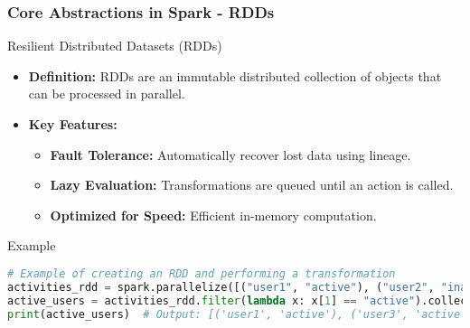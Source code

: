 \documentclass[aspectratio=169]{beamer}
\begin{document}
\begin{frame}[fragile]
    \frametitle{Core Abstractions in Spark - RDDs}
    \begin{block}{Resilient Distributed Datasets (RDDs)}
        \begin{itemize}
            \item \textbf{Definition:} 
                RDDs are an immutable distributed collection of objects that can be processed in parallel.
            \item \textbf{Key Features:}
                \begin{itemize}
                    \item \textbf{Fault Tolerance:} Automatically recover lost data using lineage.
                    \item \textbf{Lazy Evaluation:} Transformations are queued until an action is called.
                    \item \textbf{Optimized for Speed:} Efficient in-memory computation.
                \end{itemize}
        \end{itemize}
    \end{block}
    \begin{block}{Example}
        \begin{lstlisting}[language=Python]
# Example of creating an RDD and performing a transformation
activities_rdd = spark.parallelize([("user1", "active"), ("user2", "inactive"), ("user3", "active")])
active_users = activities_rdd.filter(lambda x: x[1] == "active").collect()
print(active_users)  # Output: [('user1', 'active'), ('user3', 'active')]
        \end{lstlisting}
    \end{block}
\end{frame}
\end{document}
